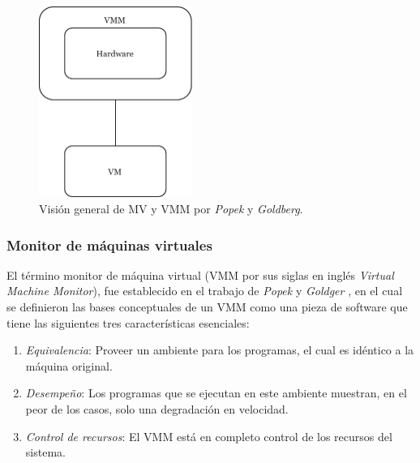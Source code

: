 \begin{figure}[!hbtp]
	\centering
	\includegraphics[width=5cm]{Pictures/VMMPopek1974.pdf}
	\vspace{-0.2cm}
	\caption{Visión general de MV y VMM por \textit{Popek} y \textit{Goldberg}.\footnotemark[2]{} }
	\label{fig:TheVirtualMachineMonitor_Popek1974}
\end{figure}


\subsubsection{Monitor de máquinas virtuales}
\vspace{5mm}
El término monitor de máquina virtual (VMM por sus siglas en inglés \textit{Virtual Machine Monitor}), fue establecido en el trabajo de \textit{Popek} y \textit{Goldger} \cite{Popek1974}, en el cual  se definieron las bases conceptuales de un VMM como una pieza de software que tiene las siguientes tres características esenciales: \\
\begin{enumerate}
	\item \textit{Equivalencia}: Proveer un ambiente para los programas, el cual es idéntico a la máquina original.\\
	
	\item \textit{Desempeño}: Los programas que se ejecutan en este ambiente muestran, en el peor de los casos, solo una degradación en velocidad.\\
	
	\item \textit{Control de recursos}: El VMM está en completo control de los recursos del sistema.\\ 
\end{enumerate}

